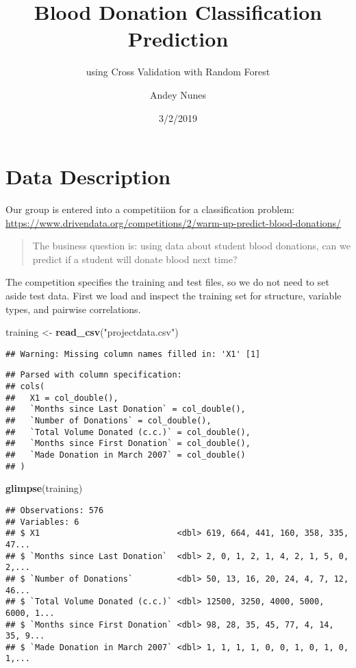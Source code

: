 \documentclass[]{article}
\title{Blood Donation Classification Prediction}
\subtitle{using Cross Validation with Random Forest}
\author{Andey Nunes}
\date{3/2/2019}
\newenvironment{Shaded}{\begin{snugshade}}{\end{snugshade}}
\newcommand{\KeywordTok}[1]{\textcolor[rgb]{0.13,0.29,0.53}{\textbf{#1}}}
\newcommand{\StringTok}[1]{\textcolor[rgb]{0.31,0.60,0.02}{#1}}
\newcommand{\NormalTok}[1]{#1}
\begin{document}
\maketitle

\section{Data Description}\label{data-description}

Our group is entered into a competitiion for a classification problem:
\url{https://www.drivendata.org/competitions/2/warm-up-predict-blood-donations/}

\begin{quote}
The business question is: using data about student blood donations, can
we predict if a student will donate blood next time?
\end{quote}

The competition specifies the training and test files, so we do not need
to set aside test data. First we load and inspect the training set for
structure, variable types, and pairwise correlations.

\begin{Shaded}
\begin{Highlighting}[]
\NormalTok{training <-}\StringTok{ }\KeywordTok{read_csv}\NormalTok{(}\StringTok{"projectdata.csv"}\NormalTok{)}
\end{Highlighting}
\end{Shaded}

\begin{verbatim}
## Warning: Missing column names filled in: 'X1' [1]
\end{verbatim}

\begin{verbatim}
## Parsed with column specification:
## cols(
##   X1 = col_double(),
##   `Months since Last Donation` = col_double(),
##   `Number of Donations` = col_double(),
##   `Total Volume Donated (c.c.)` = col_double(),
##   `Months since First Donation` = col_double(),
##   `Made Donation in March 2007` = col_double()
## )
\end{verbatim}

\begin{Shaded}
\begin{Highlighting}[]
\KeywordTok{glimpse}\NormalTok{(training)}
\end{Highlighting}
\end{Shaded}

\begin{verbatim}
## Observations: 576
## Variables: 6
## $ X1                            <dbl> 619, 664, 441, 160, 358, 335, 47...
## $ `Months since Last Donation`  <dbl> 2, 0, 1, 2, 1, 4, 2, 1, 5, 0, 2,...
## $ `Number of Donations`         <dbl> 50, 13, 16, 20, 24, 4, 7, 12, 46...
## $ `Total Volume Donated (c.c.)` <dbl> 12500, 3250, 4000, 5000, 6000, 1...
## $ `Months since First Donation` <dbl> 98, 28, 35, 45, 77, 4, 14, 35, 9...
## $ `Made Donation in March 2007` <dbl> 1, 1, 1, 1, 0, 0, 1, 0, 1, 0, 1,...
\end{verbatim}
\end{document}
